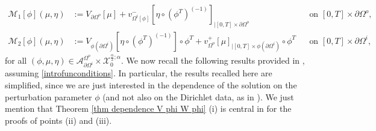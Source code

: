\documentclass[11pt,reqno,a4paper]{amsart}
\theoremstyle{plain}
\theoremstyle{definition}
\begin{document}
\begin{equation}\label{eq M Dirichlet}
\begin{aligned}
\mathcal{M}_1[\phi](\mu,\eta) & := V_{\partial\Omega^o}[\mu] + v^-_{\Omega^i[\phi]}
\left[\eta \circ (\phi^T)^{(-1)}\right]_{|[0,T] \times \partial\Omega^o} && \text{on } [0,T] \times \partial \Omega^o,
\\
\mathcal{M}_2[\phi](\mu,\eta) & :=
V_{\phi(\partial\Omega^i)}\left[\eta \circ (\phi^T)^{(-1)}\right] \circ \phi^T + v^+_{\Omega^o}[\mu]_{|[0,T] \times \phi(\partial\Omega^i)}\circ \phi^T &&\text{on } [0,T] \times \partial \Omega^i,
\end{aligned}
\end{equation}
for all $(\phi,\mu, \eta) \in \mathcal{A}^{\Omega^o}_{\partial\Omega^i} \times \mathcal{X}_0^{\frac{\alpha}{2}; \alpha}$. We now recall the following results provided in \cite{DaLuMu25}, assuming \eqref{introfunconditions}.
In particular, the results recalled here are simplified, since we are just interested in the dependence of the solution on the perturbation parameter $\phi$ (and not also on the Dirichlet data, as in \cite{DaLuMu25}).
We just mention that Theorem \ref{thm dependence V phi W phi} (i) is central in \cite{DaLuMu25} for the proofs of points (ii) and (iii).
\end{document}
